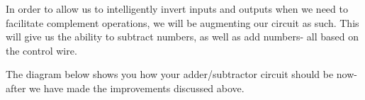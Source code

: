 \documentclass{article}
\begin{document}
In order to allow us to intelligently invert inputs and outputs when we need to facilitate complement operations, we will be augmenting our circuit as such.
This will give us the ability to subtract numbers, as well as add numbers- all based on the control wire.

The diagram below shows you how your adder/subtractor circuit should be now- after we have made the improvements discussed above.




\begin{tikzpicture}[x=0.75pt,y=0.75pt,yscale=-1,xscale=1]


\end{tikzpicture}
\end{document}
